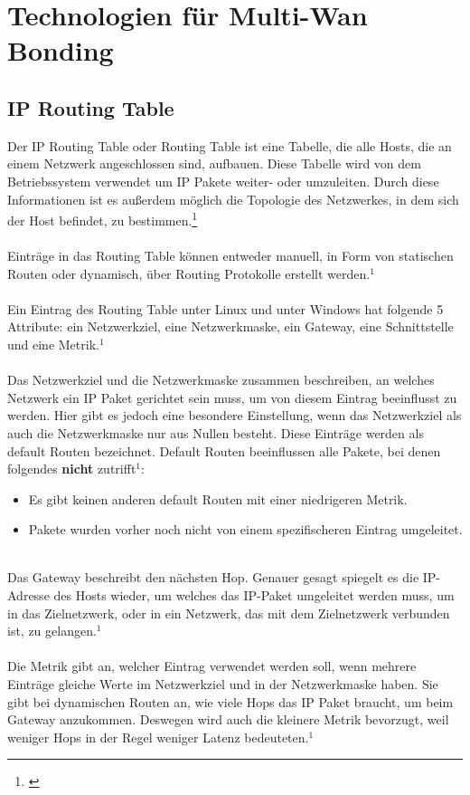 \chapter{Technologien für Multi-Wan Bonding}
\label{chap:verwendeteTechnologien}
\section{IP Routing Table}
Der IP Routing Table oder Routing Table ist eine Tabelle, die alle Hosts, die an einem Netzwerk angeschlossen sind, aufbauen. Diese Tabelle wird von dem Betriebssystem verwendet um IP Pakete weiter- oder umzuleiten. Durch diese Informationen ist es außerdem möglich die Topologie des Netzwerkes, in dem sich der Host befindet, zu bestimmen.\footnote[1]{\cite[Vgl.][]{2}}
\\\\
Einträge in das Routing Table können entweder manuell, in Form von statischen Routen oder dynamisch, über Routing Protokolle erstellt werden.$^{1}$
\\\\
Ein Eintrag des Routing Table unter Linux und unter Windows hat folgende 5 Attribute: ein Netzwerkziel, eine Netzwerkmaske, ein Gateway, eine Schnittstelle und eine Metrik.$^{1}$
\\\\
Das Netzwerkziel und die Netzwerkmaske zusammen beschreiben, an welches Netzwerk ein IP Paket gerichtet sein muss, um von diesem Eintrag beeinflusst zu werden. Hier gibt es jedoch eine besondere Einstellung, wenn das Netzwerkziel als auch die Netzwerkmaske nur aus Nullen besteht. Diese Einträge werden als default Routen bezeichnet. Default Routen beeinflussen alle Pakete, bei denen folgendes \textbf{nicht} zutrifft$^{1}$: 
\\
\begin{itemize}
    \item Es gibt keinen anderen default Routen mit einer niedrigeren Metrik.
    \item Pakete wurden vorher noch nicht von einem spezifischeren Eintrag umgeleitet.
\end{itemize}
\ \\
Das Gateway beschreibt den nächsten Hop. Genauer gesagt spiegelt es die IP-Adresse des Hosts wieder, um welches das IP-Paket umgeleitet werden muss, um in das Zielnetzwerk, oder in ein Netzwerk, das mit dem Zielnetzwerk verbunden ist, zu gelangen.$^{1}$
\\\\
Die Metrik gibt an, welcher Eintrag verwendet werden soll, wenn mehrere Einträge gleiche Werte im Netzwerkziel und in der Netzwerkmaske haben. Sie gibt bei dynamischen Routen an, wie viele Hops das IP Paket braucht, um beim Gateway anzukommen. Deswegen wird auch die kleinere Metrik bevorzugt, weil weniger Hops in der Regel weniger Latenz bedeuteten.$^{1}$
